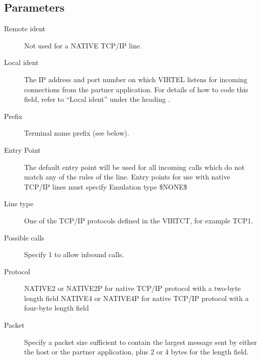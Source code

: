 \documentclass[letterpaper,10pt,english]{sphinxmanual}
\begin{document}
\subsection{Parameters}
\label{\detokenize{connectivity_guide:index-35}}\label{\detokenize{connectivity_guide:id12}}\begin{description}
\item[{Remote ident}] \leavevmode
Not used for a NATIVE TCP/IP line.

\item[{Local ident}] \leavevmode
The IP address and port number on which VIRTEL listens for incoming connections from the partner application. For details of how to code this field, refer to “Local ident” under the heading {\hyperref[\detokenize{connectivity_guide:bookmark13}]{}}.

\item[{Prefix}] \leavevmode
Terminal name prefix (see below).

\item[{Entry Point}] \leavevmode
The default entry point will be used for all incoming calls which do not match any of the rules of the line. Entry points for use with native TCP/IP lines must specify Emulation type \$NONE\$

\item[{Line type}] \leavevmode
One of the TCP/IP protocols defined in the VIRTCT, for example TCP1.

\item[{Possible calls}] \leavevmode
Specify 1 to allow inbound calls.

\item[{Protocol}] \leavevmode
NATIVE2 or NATIVE2P for native TCP/IP protocol with a two-byte length field NATIVE4 or NATIVE4P for native TCP/IP protocol with a four-byte length field

\item[{Packet}] \leavevmode
Specify a packet size sufficient to contain the largest message sent by either the host or the partner application, plus 2 or 4 bytes for the length field.

\end{description}

\ignorespaces 
\end{document}
